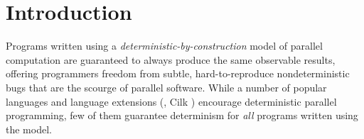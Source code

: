 \section{Introduction}


Programs written using a {\em deterministic-by-construction} model of
parallel computation are guaranteed to always produce the same
observable results, offering programmers freedom from subtle,
hard-to-reproduce nondeterministic bugs that are the scourge of
parallel software.  While a number of popular languages and language
extensions (\eg, Cilk \cite{cilk}) encourage
deterministic parallel programming, few of them guarantee determinism
for {\em all} programs written using the model.


